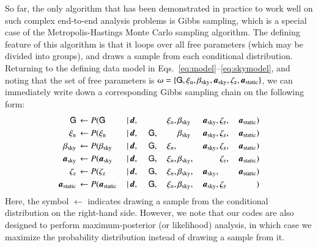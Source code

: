 \documentclass{aa}
\newcommand{\dv}[0]{\vec{d}}
\newcommand{\G}[0]{\tens{G}}
\renewcommand{\a}[0]{\vec{a}}
\begin{document}
So far, the only algorithm that has been demonstrated in practice to
work well on such complex end-to-end analysis problems is Gibbs
sampling, which is a special case of the Metropolis-Hastings Monte
Carlo sampling algorithm. The defining feature of this algorithm is
that it loops over all free parameters (which may be divided into
groups), and draws a sample from each conditional
distribution. Returning to the defining data model in
Eqs.~\eqref{eq:model}--\eqref{eq:skymodel}, and noting that the set
of free parameters is $\omega = \{\G,\xi_{\mathrm{n}},
\beta_{\mathrm{sky}},\a_{\mathrm{sky}},\zeta_{\mathrm{z}},\a_{\mathrm{static}}\}$,
we can immediately write down a corresponding Gibbs sampling chain on
the following form:
\begin{alignat}{11}
\G &\,\leftarrow P(\G&\,\mid &\,\dv,&\, &\,\phantom{\G} &\,\xi_n, &
\,\beta_{\mathrm{sky}}& \,\a_{\mathrm{sky}}, &\,\zeta_{\mathrm{z}},
&\,\a_{\mathrm{static}})\label{eq:gibbs_G}\\
\xi_{\mathrm{n}} &\,\leftarrow P(\xi_{\mathrm{n}}&\,\mid &\,\dv,&\, &\,\G, &\,\phantom{\xi_n} &
\,\beta_{\mathrm{sky}}& \,\a_{\mathrm{sky}}, &\,\zeta_{\mathrm{z}},
&\,\a_{\mathrm{static}})\\
\beta_{\mathrm{sky}} &\,\leftarrow P(\beta_{\mathrm{sky}}&\,\mid &\,\dv,&\, &\,\G, &\,\xi_n, &
\,\phantom{\beta_{\mathrm{sky}}}& \,\a_{\mathrm{sky}}, &\,\zeta_{\mathrm{z}}, &\,\a_{\mathrm{static}})\\
\a_{\mathrm{sky}} &\,\leftarrow P(\a_{\mathrm{sky}}&\,\mid &\,\dv,&\, &\,\G, &\,\xi_n, &
\,\beta_{\mathrm{sky}},& \,\phantom{\a_{\mathrm{sky}},}
&\,\zeta_{\mathrm{z}}, &\,\a_{\mathrm{static}})\\
\zeta_{\mathrm{z}} &\,\leftarrow P(\zeta_{\mathrm{z}}&\,\mid &\,\dv,&\, &\,\G, &\,\xi_n, &
\,\beta_{\mathrm{sky}},& \,\a_{\mathrm{sky}},
&\,\phantom{\zeta_{\mathrm{z}},} &\,\a_{\mathrm{static}})\label{eq:gibbs_zodi}\\
\a_{\mathrm{static}} &\,\leftarrow P(\a_{\mathrm{static}}&\,\mid &\,\dv,&\, &\,\G, &\,\xi_n, &
\,\beta_{\mathrm{sky}},& \,\a_{\mathrm{sky}}, &\,\zeta_{\mathrm{z}} &\,\phantom{\a_{\mathrm{static}}})\label{eq:gibbs_static}
\end{alignat}
Here, the symbol $\leftarrow$ indicates drawing a sample from the
conditional distribution on the right-hand side. However, we note that
our codes are also designed to perform maximum-posterior (or
likelihood) analysis, in which case we maximize the probability
distribution instead of drawing a sample from it.
\end{document}
